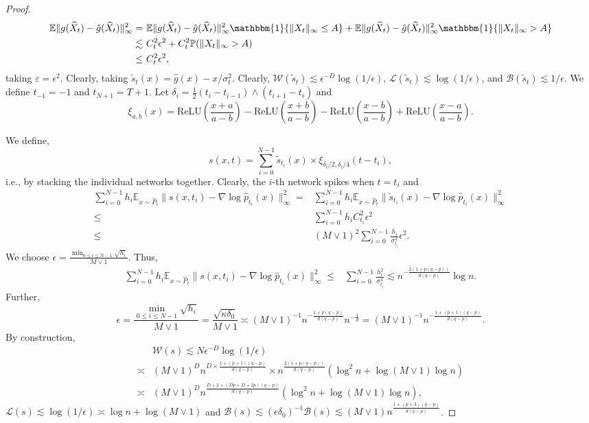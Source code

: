 \documentclass[12pts]{article}
\newcommand{\prob}{\mathbb{P}}
\newcommand{\one}{\mathbbm{1}}
\newcommand{\cB}{ \mathcal{B}}
\newcommand{\cL}{ \mathcal{L}}
\newcommand{\cW}{ \mathcal{W}}
\newcommand{\hX}{ \widehat{X}}
\newcommand{\E}{\mathbb{E}}
\newcommand{\relu}{\text{ReLU}}
\begin{document}
\begin{proof}
\begin{align*}
   \E\| g(\hX_t) - \hat{g}(\hX_t) \|_\infty^2 
    = & \ \E\| g(\hX_t) - \hat{g}(\hX_t) \|_\infty^2 \one\{\|X_t\|_\infty \le A\} 
    + \E\| g(\hX_t) - \hat{g}(\hX_t) \|_\infty^2 \one\{\|X_t\|_\infty > A\}\\
    \lesssim & \ C_t^2 \epsilon^2 + C_t^2 \prob(\|X_t\|_\infty > A)\\
    \le & \ C_t^2 \epsilon^2,
\end{align*}
taking $\varepsilon = \epsilon^2$. Clearly, taking $\tilde{s}_t(x)= \hat{g}(x) - x/\sigma^2_t $. Clearly, $\cW(\tilde{s}_t) \lesssim \epsilon^{-D} \log(1/\epsilon)$, $\cL(\tilde{s}_t) \lesssim \log(1/\epsilon)$, and $\cB(\tilde{s}_t) \lesssim 1/\epsilon$. We define $t_{-1} = -1$ and $t_{N+1} = T+1$. Let $\delta_i = \frac{1}{2} (t_i - t_{i-1}) \wedge (t_{i+1} - t_i)$ and 
\[\xi_{a, b}(x) = \relu\left(\frac{x+a}{a-b}\right) - \relu\left(\frac{x+b}{a-b}\right) - \relu\left(\frac{x-b}{a-b}\right) + \relu\left(\frac{x-a}{a-b}\right).\]

We define, 
\[s(x,t) = \sum_{i=0}^{N-1} \tilde{s}_{t_i}(x) \times \xi_{\delta_i/2, \delta_i/4}(t-t_i),\]
i.e., by stacking the individual networks together. Clearly, the $i$-th network spikes when $t = t_i$ and 
\begingroup
\allowdisplaybreaks
\begin{align*}
    \sum_{i=0}^{N-1} h_i \E_{x \sim \hat{P}_t}\|s(x,t_i) - \nabla \log \hat{p}_{t_i}(x)\|^2_\infty = & \sum_{i=0}^{N-1} h_i \E_{x \sim \hat{P}_t}\|\tilde{s}_{t_i}(x) - \nabla \log \hat{p}_{t_i}(x)\|^2_\infty\\
    \le & \sum_{i=0}^{N-1} h_i C_{t_i}^2 \epsilon^2\\
    \le & (M \vee 1)^2 \sum_{i=0}^{N-1} \frac{h_i}{\sigma_{t_i}^4} \epsilon^2.
\end{align*}
\endgroup
We choose $\epsilon = \frac{\min_{0 \le i \le N-1} \sqrt{h_i}}{M \vee 1}$. Thus,
\begin{align*}
    \sum_{i=0}^{N-1} h_i \E_{x \sim \hat{P}_t}\|s(x,t_i) - \nabla \log \hat{p}_{t_i}(x)\|^2_\infty 
    \le &  \sum_{i=0}^{N-1} \frac{h_i^2}{\sigma_{t_i}^4} \lesssim  n^{-\frac{2 (1+p(q-p))}{d(q-p)}} \log n.
\end{align*}
Further, 
\[\epsilon = \frac{\min_{0 \le i \le N-1} \sqrt{h_i}}{{M \vee 1}} = \frac{\sqrt{\kappa \delta_0}}{M \vee 1} \asymp (M \vee 1)^{-1} n^{-\frac{ 1+p(q-p)}{d(q-p)}} n^{-\frac{1}{d}} = (M \vee 1)^{-1}  n^{-\frac{1+(p+1) (q-p)}{d(q-p)}}. \]
By construction,
\begingroup
\allowdisplaybreaks
\begin{align*}
    & \cW(s) \lesssim N \epsilon^{-D} \log(1/\epsilon) \\
    \asymp & (M \vee 1)^{D} n^{D \times \frac{1+(p+1) (q-p)}{d(q-p)}} \times n^{\frac{ 2(1+p(q-p))}{d(q-p)}} \left(\log^2 n + \log (M \vee 1) \log n\right)\\
    \asymp & (M \vee 1)^{D} n^{\frac{D+2 + (Dp + D + 2p) (q-p)}{d(q-p)}} \left(\log^2 n + \log (M \vee 1) \log n\right),
\end{align*}
\endgroup
  $\cL(s) \lesssim \log (1/\epsilon) \asymp \log n + \log (M \vee 1)$ and $\cB(s) \lesssim (\epsilon \delta_0)^{-1}\cB(s) \lesssim (M \vee 1)  n^{\frac{1+(p+3)(q-p)}{d(q-p)}}$.
\end{proof}
\end{document}
